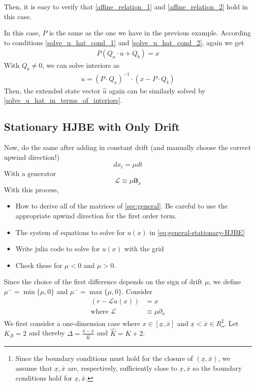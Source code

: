 \documentclass[11pt]{article}
\newcommand{\D}[1][]{\ensuremath{\boldsymbol{\partial}_{#1}}}
\begin{document}
Then, it is easy to verify that \eqref{affine_relation_1} and \eqref{affine_relation_2} hold in this case.

In this case, $P$ is the same as the one we have in the previous example. According to conditions \eqref{solve_u_hat_cond_1} and \eqref{solve_u_hat_cond_2}, again we get
\begin{align}
P(Q_a\cdot u+Q_b) = x
\end{align}
With $Q_b\neq 0$, we can solve interiors as 
\begin{align}
u = (P\cdot Q_a)^{-1}\cdot(x-P\cdot Q_b)
\end{align}
Then, the extended state vector $\hat{u}$ again can be similarly solved by \eqref{solve_u_hat_in_terms_of_interiors}.
\subsection{Stationary HJBE with Only Drift}
Now, do the same after adding in constant drift (and manually choose the correct upwind direction!)
$$
d x_t = \mu dt
$$
With a generator
$$
	\mathcal{L} \equiv \mu \D[x]
$$
With this process,
\begin{itemize}
	\item How to derive all of the matrices of \cref{sec:general}.  Be careful to use the appropriate upwind direction for the first order term.
	\item The system of equations to solve for $u(x)$ in \cref{eq:general-stationary-HJBE}
	\item Write julia code to solve for $u(x)$ with the grid
	\item Check these for $\mu < 0$ and $\mu > 0$.
\end{itemize}
Since the choice of the first difference depends on the sign of drift $\mu$, we define $\mu^- =\min\{\mu, 0\}$ and $\mu^- =\max\{\mu, 0\}$.
Consider
\begin{align}
(r- \mathcal{L} u(x)) &= x\label{HJBE_PDE_with_drifts}\\
\text{where }\mathcal{L}&\equiv \mu\partial_{x}
\end{align}
We first consider a one-dimension case where $x\in [\underline{\textit{\~{x}}}, \bar{\textit{\~{x}}}]$ and $\underline{\textit{\~{x}}} < \bar{\textit{\~{x}}} \in R$\footnote{Since the boundary conditions must hold for the closure of $(\underline{x},\bar{x})$, we assume that $\underline{\textit{\~{x}}}, \bar{\textit{\~{x}}}$ are, respectively, sufficiently close to $\underline{x}, \bar{x}$ so the boundary conditions hold for $\underline{\textit{\~{x}}}, \bar{\textit{\~{x}}}$.}. Let $K_B = 2$ and thereby $\Delta  = \frac{\bar{\textit{\~{x}}} - \underline{\textit{\~{x}}}}{\hat{K}}$ and $\hat{K} = K+2$. 
\end{document}
